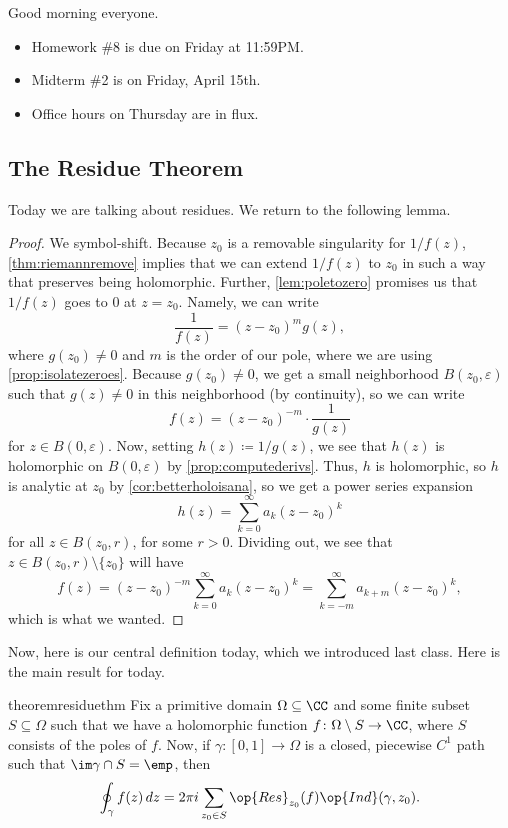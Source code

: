 
Good morning everyone.
\begin{itemize}
	\item Homework \#8 is due on Friday at 11:59PM.
	\item Midterm \#2 is on Friday, April 15th.
	\item Office hours on Thursday are in flux.
\end{itemize}

\subsection{The Residue Theorem}
Today we are talking about residues. We return to the following lemma.
\laurent*
\begin{proof}
	We symbol-shift. Because $z_0$ is a removable singularity for $1/f(z)$, \autoref{thm:riemannremove} implies that we can extend $1/f(z)$ to $z_0$ in such a way that preserves being holomorphic. Further, \autoref{lem:poletozero} promises us that $1/f(z)$ goes to $0$ at $z=z_0$. Namely, we can write
	\[\frac1{f(z)}=(z-z_0)^mg(z),\]
	where $g(z_0)\ne0$ and $m$ is the order of our pole, where we are using \autoref{prop:isolatezeroes}. Because $g(z_0)\ne0$, we get a small neighborhood $B(z_0,\varepsilon)$ such that $g(z)\ne0$ in this neighborhood (by continuity), so we can write
	\[f(z)=(z-z_0)^{-m}\cdot\frac1{g(z)}\]
	for $z\in B(0,\varepsilon)$. Now, setting $h(z)\coloneqq 1/g(z)$, we see that $h(z)$ is holomorphic on $B(0,\varepsilon)$ by \autoref{prop:computederivs}. Thus, $h$ is holomorphic, so $h$ is analytic at $z_0$ by \autoref{cor:betterholoisana}, so we get a power series expansion
	\[h(z)=\sum_{k=0}^\infty a_k(z-z_0)^k\]
	for all $z\in B(z_0,r)$, for some $r>0$. Dividing out, we see that $z\in B(z_0,r)\setminus\{z_0\}$ will have
	\[f(z)=(z-z_0)^{-m}\sum_{k=0}^\infty a_k(z-z_0)^k=\sum_{k=-m}^\infty a_{k+m}(z-z_0)^k,\]
	which is what we wanted.
\end{proof}
Now, here is our central definition today, which we introduced last class.
\resideudef*
\noindent Here is the main result for today.
\begin{restatable}[Residue]{theorem}{residuethm} \label{thm:residue}
	Fix a primitive domain $\Omega\subseteq\CC$ and some finite subset $S\subseteq\Omega$ such that we have a holomorphic function $f\colon \Omega\setminus S\to\CC$, where $S$ consists of the poles of $f$. Now, if $\gamma\colon [0,1]\to\Omega$ is a closed, piecewise $C^1$ path such that $\im\gamma\cap S=\emp$, then
	\[\oint_\gamma f(z)\,dz=2\pi i\sum_{z_0\in S}\op{Res}_{z_0}(f)\op{Ind}(\gamma,z_0).\]
\end{restatable}
